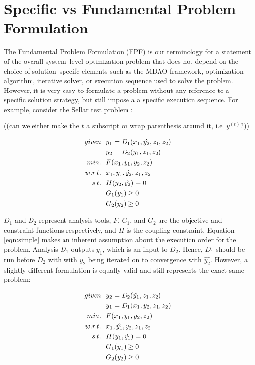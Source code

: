 \section{Specific vs Fundamental Problem Formulation }
	\label{s:specific vs fundamental}
    The Fundamental Problem Formulation (FPF) is our terminology for a statement of the overall system--level optimization problem that does not depend on the choice of solution--specifc elements such as the MDAO framework, optimization algorithm, iterative solver, or execution sequence
    used to solve the problem. However, it is very easy to formulate a problem without 
    any reference to a specific solution strategy, but still impose a a specific execution sequence.
    For example, consider the Sellar test problem \cite{AIAA:sellar}: 

((can we either make the $t$ a subscript or wrap parenthesis around it, i.e. $y^{(t)}$?))

    \begin{align}
        given & \ \ y_1 = D_1(x_1,\hat{y_2},z_1,z_2) \notag
        \\      & \ \ y_2 = D_2(y_1,z_1,z_2) \notag
        \\min. &\ \ F(x_1,y_1,y_2,z_2) \notag
        \\w.r.t. & \ \ x_1,y_1,\hat{y_2},z_1,z_2 \notag
        \\s.t. & \ \ H(y_2,\hat{y_2}) = 0 \notag 
        \\     & \ \ G_1(y_1) \geq 0 \notag
        \\     & \ \ G_2(y_2) \geq 0
        \label{eqn:simple}
    \end{align}

    $D_1$ and $D_2$ represent analysis tools, $F$, $G_1$, and $G_2$ are the objective 
    and constraint functions respectively, and $H$ is the coupling constraint. 
    Equation \ref{eqn:simple} makes an inherent assumption about the execution 
    order for the problem. Analysis $D_1$ outputs $y_1$, which is an input to $D_2$. 
    Hence, $D_1$ should be run before $D_2$ with with $y_2$ being iterated on 
    to convergence with $\hat{y_2}$. However, a slightly different formulation 
    is equally valid and still represents the exact same problem: 

    \begin{align}
        given & \ \ y_2 = D_2(\hat{y_1},z_1,z_2) \notag
        \\      & \ \ y_1 = D_1(x_1,y_2,z_1,z_2) \notag
        \\min. &\ \ F(x_1,y_1,y_2,z_2) \notag
        \\w.r.t. & \ \ x_1,\hat{y_1},y_2,z_1,z_2 \notag
        \\s.t. & \ \ H(y_1,\hat{y_1}) = 0 \notag 
        \\     & \ \ G_1(y_1) \geq 0 \notag
        \\     & \ \ G_2(y_2) \geq 0
        \label{eqn:simple2}
    \end{align}

